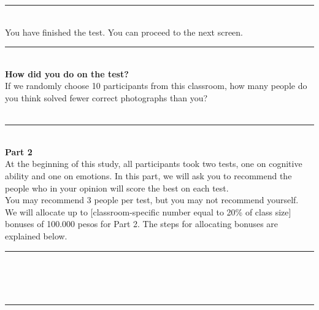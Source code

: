\documentclass[11pt,a4paper,oneside]{article}
\begin{document}
\noindent\rule{\textwidth}{0.4pt}\\

\noindent You have finished the test. You can proceed to the next screen. \\

\noindent\rule{\textwidth}{0.4pt}\\

\noindent \textbf{How did you do on the test?} \\

\noindent If we randomly choose 10 participants from this classroom, how many people do you think solved fewer correct photographs than you?\\

\\

\noindent\rule{\textwidth}{0.4pt}\\

\noindent \textbf{Part 2} \\
 
\noindent At the beginning of this study, all participants took two tests, one on cognitive ability and one on emotions. In this part, we will ask you to recommend the people who in your opinion will score the best on each test. \\

\noindent You may recommend 3 people per test, but you may not recommend yourself. \\

\noindent We will allocate up to [classroom-specific number equal to 20\% of class size] bonuses of 100.000 pesos for Part 2. The steps for allocating bonuses are explained below. \\

\noindent\rule{\textwidth}{0.4pt}\\

 \\

 \\

\noindent\rule{\textwidth}{0.4pt}\\

 \\
\end{document}
